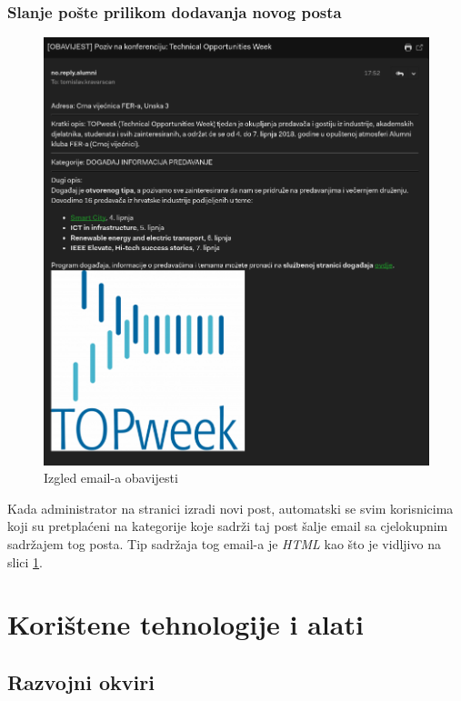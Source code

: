 \documentclass[zavrsni, numeric]{fer}
\begin{document}
\subsection{Slanje pošte prilikom dodavanja novog posta}

\begin{figure}[H]
	\centering
	\includegraphics[width=13cm]{slike/mail.png}
	\caption{Izgled email-a obavijesti} 
	\label{fig:mail}
\end{figure}

Kada administrator na stranici izradi novi post, automatski se svim korisnicima koji su pretplaćeni na kategorije koje sadrži taj post šalje email sa cjelokupnim sadržajem tog posta. Tip sadržaja tog email-a je \textit{HTML} kao što je vidljivo na slici \ref{fig:mail}. 

\chapter{Korištene tehnologije i alati}

\section{Razvojni okviri}
\end{document}
